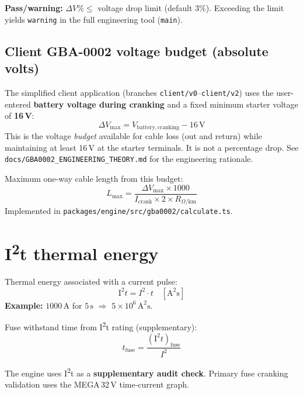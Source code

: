 \documentclass[11pt,a4paper]{report}
\begin{document}
\textbf{Pass/warning:} $\Delta V\% \leq$ voltage drop limit (default 3\%). Exceeding the limit yields \texttt{warning} in the full engineering tool (\texttt{main}).

\subsection{Client GBA-0002 voltage budget (absolute volts)}

The simplified client application (branches \texttt{client/v0}--\texttt{client/v2}) uses the user-entered \textbf{battery voltage during cranking} and a fixed minimum starter voltage of \textbf{16\,V}:
\begin{equation}
  \Delta V_\mathrm{max} = V_\mathrm{battery,cranking} - 16\,\mathrm{V}
\end{equation}
This is the voltage \emph{budget} available for cable loss (out and return) while maintaining at least 16\,V at the starter terminals. It is not a percentage drop. See \texttt{docs/GBA0002\_ENGINEERING\_THEORY.md} for the engineering rationale.

Maximum one-way cable length from this budget:
\begin{equation}
  L_\mathrm{max} = \frac{\Delta V_\mathrm{max} \times 1000}{I_\mathrm{crank} \times 2 \times R_{\Omega/\mathrm{km}}}
\end{equation}
Implemented in \texttt{packages/engine/src/gba0002/calculate.ts}.

\section{I\textsuperscript{2}t thermal energy}

Thermal energy associated with a current pulse:
\begin{equation}
  \mathrm{I}^2 t = I^2 \cdot t \quad [\mathrm{A}^2\mathrm{s}]
\end{equation}
\textbf{Example:} $1000\,\mathrm{A}$ for $5\,\mathrm{s}$ $\Rightarrow$ $5 \times 10^6\,\mathrm{A}^2\mathrm{s}$.

Fuse withstand time from I\textsuperscript{2}t rating (supplementary):
\begin{equation}
  t_\mathrm{fuse} = \frac{(\mathrm{I}^2 t)_\mathrm{fuse}}{I^2}
\end{equation}

The engine uses I\textsuperscript{2}t as a \textbf{supplementary audit check}. Primary fuse cranking validation uses the MEGA\,32\,V time-current graph.
\end{document}
